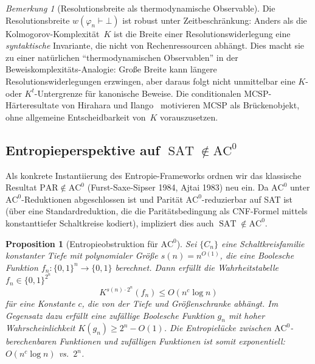 \documentclass[aps,prd,twocolumn,superscriptaddress,nofootinbib]{revtex4-2}
\newtheorem{proposition}[theorem]{Proposition}
\theoremstyle{definition}
\theoremstyle{remark}
\newtheorem{remark}[theorem]{Bemerkung}
\DeclareMathOperator{\SAT}{SAT}
\begin{document}
\begin{remark}[Resolutionsbreite als thermodynamische Observable]\label{rem:width-observable}
Die Resolutionsbreite $w(\varphi_n \vdash \bot)$ ist robust unter Zeitbeschränkung: Anders als die Kolmogorov-Komplexität~$K$ ist die Breite einer Resolutionswiderlegung eine \emph{syntaktische} Invariante, die nicht von Rechenressourcen abhängt. Dies macht sie zu einer natürlichen "`thermodynamischen Observablen"' in der Beweiskomplexitäts-Analogie: Große Breite kann längere Resolutionswiderlegungen erzwingen, aber daraus folgt nicht unmittelbar eine $K$- oder $K^t$-Untergrenze für kanonische Beweise. Die conditionalen MCSP-Härteresultate von Hirahara und Ilango~\cite{Ilango2025} motivieren MCSP als Brückenobjekt, ohne allgemeine Entscheidbarkeit von~$K$ vorauszusetzen.
\end{remark}

\subsection{\texorpdfstring{Entropieperspektive auf $\SAT \notin \mathrm{AC}^0$}{Entropieperspektive auf SAT nicht in AC0}}
\label{sec:ac0}

Als konkrete Instantiierung des Entropie-Frameworks ordnen wir das klassische Resultat $\mathrm{PAR} \notin \mathrm{AC}^0$ (Furst-Saxe-Sipser 1984, Ajtai 1983) neu ein. Da $\mathrm{AC}^0$ unter $\mathrm{AC}^0$-Reduktionen abgeschlossen ist und Parität $\mathrm{AC}^0$-reduzierbar auf SAT ist (über eine Standardreduktion, die die Paritätsbedingung als CNF-Formel mittels konstanttiefer Schaltkreise kodiert), impliziert dies auch $\SAT \notin \mathrm{AC}^0$.

\begin{proposition}[Entropieobstruktion für $\mathrm{AC}^0$]
\label{prop:ac0}
Sei $\{C_n\}$ eine Schaltkreisfamilie konstanter Tiefe mit polynomialer Größe $s(n) = n^{O(1)}$, die eine Boolesche Funktion $f_n: \{0,1\}^n \to \{0,1\}$ berechnet. Dann erfüllt die Wahrheitstabelle $f_n \in \{0,1\}^{2^n}$
\begin{equation}
K^{s(n) \cdot 2^n}(f_n) \leq O(n^c \log n)
\end{equation}
für eine Konstante $c$, die von der Tiefe und Größenschranke abhängt. Im Gegensatz dazu erfüllt eine \textit{zufällige} Boolesche Funktion $g_n$ mit hoher Wahrscheinlichkeit $K(g_n) \geq 2^n - O(1)$. Die Entropielücke zwischen $\mathrm{AC}^0$-berechenbaren Funktionen und zufälligen Funktionen ist somit exponentiell: $O(n^c \log n)$ vs.\ $2^n$.
\end{proposition}
\end{document}
